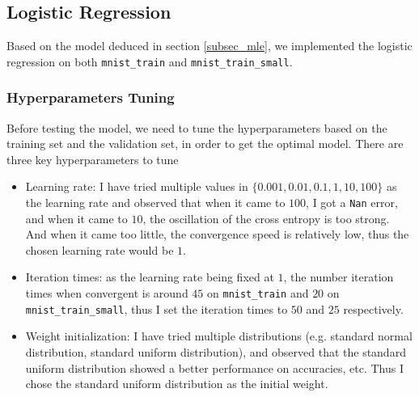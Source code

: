 \documentclass[10pt]{article}
\begin{document}
\subsection{Logistic Regression}
Based on the model deduced in section \ref{subsec_mle}, we implemented the logistic regression on both \texttt{mnist\_train} and \texttt{mnist\_train\_small}.\par
\subsubsection{Hyperparameters Tuning}
Before testing the model, we need to tune the hyperparameters based on the training set and the validation set, in order to get the optimal model. There are three key hyperparameters to tune
\begin{itemize}
\item Learning rate: I have tried multiple values in $\{0.001, 0.01, 0.1, 1, 10, 100\}$ as the learning rate and observed that when it came to $100$, I got a \texttt{Nan} error, and when it came to $10$, the oscillation of the cross entropy is too strong. And when it came too little, the convergence speed is relatively low, thus the chosen learning rate would be $1$.
\item Iteration times: as the learning rate being fixed at $1$, the number iteration times when convergent is around $45$ on \texttt{mnist\_train} and $20$ on \texttt{mnist\_train\_small}, thus I set the iteration times to $50$ and $25$ respectively.
\item Weight initialization: I have tried multiple distributions (e.g. standard normal distribution, standard uniform distribution), and observed that the standard uniform distribution showed a better performance on accuracies, etc. Thus I chose the standard uniform distribution as the initial weight.
\end{itemize}
\end{document}

